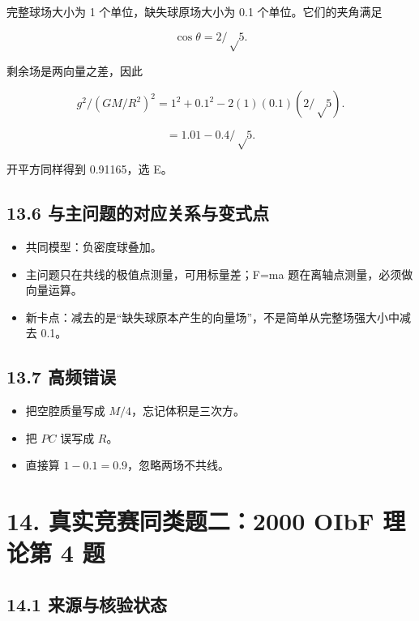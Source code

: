 \documentclass[
  11pt,
  UTF8]{ctexart}
\providecommand{\tightlist}{%
  \setlength{\itemsep}{0pt}\setlength{\parskip}{0pt}}
\begin{document}
完整球场大小为 1 个单位，缺失球原场大小为 0.1 个单位。它们的夹角满足

\[\cos θ=2/√5.\]

剩余场是两向量之差，因此

\[g^2/(GM/R^2)^2=1^2+0.1^2-2(1)(0.1)(2/√5).\]

\[=1.01-0.4/√5.\]

开平方同样得到 0.91165，选 E。

\hypertarget{ux4e0eux4e3bux95eeux9898ux7684ux5bf9ux5e94ux5173ux7cfbux4e0eux53d8ux5f0fux70b9}{%
\subsection{13.6
与主问题的对应关系与变式点}\label{ux4e0eux4e3bux95eeux9898ux7684ux5bf9ux5e94ux5173ux7cfbux4e0eux53d8ux5f0fux70b9}}

\begin{itemize}
\tightlist
\item
  共同模型：负密度球叠加。
\item
  主问题只在共线的极值点测量，可用标量差；F=ma
  题在离轴点测量，必须做向量运算。
\item
  新卡点：减去的是``缺失球原本产生的向量场''，不是简单从完整场强大小中减去
  0.1。
\end{itemize}

\hypertarget{ux9ad8ux9891ux9519ux8bef}{%
\subsection{13.7 高频错误}\label{ux9ad8ux9891ux9519ux8bef}}

\begin{itemize}
\tightlist
\item
  把空腔质量写成 \(M/4\)，忘记体积是三次方。
\item
  把 \(PC\) 误写成 \(R\)。
\item
  直接算 \(1-0.1=0.9\)，忽略两场不共线。
\end{itemize}

\hypertarget{ux771fux5b9eux7adeux8d5bux540cux7c7bux9898ux4e8c2000-oibf-ux7406ux8bbaux7b2c-4-ux9898}{%
\section{14. 真实竞赛同类题二：2000 OIbF 理论第 4
题}\label{ux771fux5b9eux7adeux8d5bux540cux7c7bux9898ux4e8c2000-oibf-ux7406ux8bbaux7b2c-4-ux9898}}

\hypertarget{ux6765ux6e90ux4e0eux6838ux9a8cux72b6ux6001}{%
\subsection{14.1
来源与核验状态}\label{ux6765ux6e90ux4e0eux6838ux9a8cux72b6ux6001}}
\end{document}
